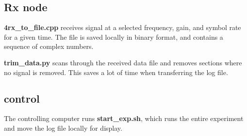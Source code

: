\documentclass[10pt]{article}
\begin{document}
\subsection{Rx node}
\textbf{4rx\_to\_file.cpp} receives signal at a selected frequency, gain, and symbol rate for a given time.  The file is saved locally in binary format, and contains a sequence of complex numbers.

\textbf{trim\_data.py} scans through the received data file and removes sections where no signal is removed.  This saves a lot of time when transferring the log file.

\subsection{control}
The controlling computer runs \textbf{start\_exp.sh}, which runs the entire experiment and move the log file locally for display.
\end{document}
